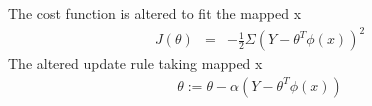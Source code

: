 \begin{answer}
The cost function is altered to fit the mapped x
\begin{eqnarray*}
	J(\theta) &=& -\frac{1}{2} \Sigma(Y - \theta^T\phi(x))^2	
\end{eqnarray*}
The altered update rule taking mapped x
\begin{eqnarray*}
	\theta := \theta - \alpha(Y - \theta^T\phi(x))
\end{eqnarray*}

\end{answer}
